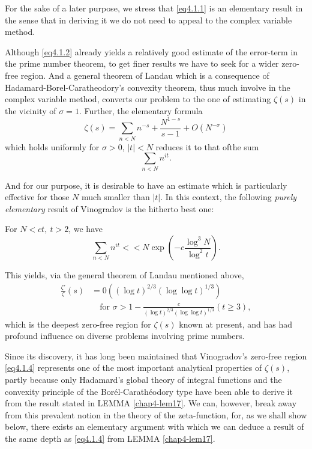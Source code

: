 For the sake of a later purpose, we stress that \eqref{eq4.1.1} is an
elementary result in the sense that in deriving it we do not need to
appeal to the complex variable method. 

Although \eqref{eq4.1.2} already yields a relatively good estimate of the
error-term in the prime number theorem, to get finer results we have
to seek for a wider zero-free region. And a general theorem of Landau
which is a consequence of Hadamard-Borel-Caratheodory's convexity
theorem, thus much involve in the complex variable method, converts
our problem to the one of estimating $\zeta (s)$ in the vicinity of
$\sigma = 1$. Further, the elementary formula 
\begin{equation*}
  \zeta (s) = \sum_{n < N} n^{-s} + \frac{N^{1-s}}{s-1} + O
  (N^{-\sigma}) \tag{4.1.3}\label{eq4.1.3} 
\end{equation*}
which holds uniformly for $\sigma > 0$, $| t | < N$ reduces it to that
of\pageoriginale the sum 
$$
\sum_{n<N} n^{it}.
$$

And for our purpose, it is desirable to have an estimate which is
particularly effective for those $N$ much smaller than $| t |$. In
this context, the following \textit{purely elementary} result of
Vinogradov is the hitherto best one: 

\begin{Lemma}\label{chap4-lem17}%
For $N < ct, ~ t > 2$, we have
  $$
   \sum_{n<N} n^{it} < < N \exp \left(-c \frac{\log^3 N}{\log^2 t}\right).
  $$
\end{Lemma}

This yields, via the general theorem of Landau mentioned above, 
\begin{equation*}
\begin{split}
\frac{\zeta '}{\zeta} (s) &= 0\left((\log t)^{2/3} (\log \log
  t)^{1/3} \right)\\ 
&\quad\text{for } \sigma > 1 - \frac{c}{(\log t)^{2/3} (\log \log t)^{1/3}}
(t \geq 3),
\end{split}\tag{4.1.4}\label{eq4.1.4}
\end{equation*}
which is the deepest zero-free region for $\zeta (s)$ known at
present, and has had profound influence on diverse problems involving
prime numbers. 

Since its discovery, it has long been maintained that Vinogradov's
zero-free region \eqref{eq4.1.4} represents one of the most important
analytical properties of $\zeta (s)$, partly because only Hadamard's
global theory of integral functions and the convexity principle of the
Bor\'el-Carath\'eodory type have been able to derive it\pageoriginale
from the result 
stated in LEMMA \ref{chap4-lem17}. We can, however, break away from
this prevalent 
notion in the theory of the zeta-function, for, as we shall show
below, there exists an elementary argument with which we can deduce a
result of the same depth as \eqref{eq4.1.4} from LEMMA \ref{chap4-lem17}. 

